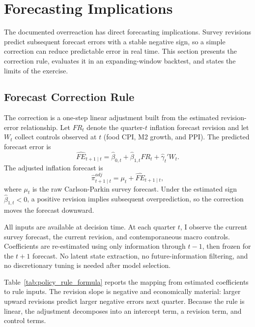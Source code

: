 \section{Forecasting Implications}\label{sec:policy}

The documented overreaction has direct forecasting implications.
Survey revisions predict subsequent forecast errors with a stable
negative sign, so a simple correction can reduce predictable error in
real time. This section presents the correction rule, evaluates it in
an expanding-window backtest, and states the limits of the exercise.

\subsection{Forecast Correction Rule}

The correction is a one-step linear adjustment built from the estimated
revision-error relationship. Let $FR_t$ denote the quarter-$t$
inflation forecast revision and let $W_t$ collect controls observed at
$t$ (food CPI, M2 growth, and PPI). The predicted forecast error is
\begin{equation}\label{eq:policy_rule_policy}
  \widehat{FE}_{t+1 \mid t}
  = \hat{\beta}_{0,t} + \hat{\beta}_{1,t} FR_t + \hat{\gamma}_t' W_t .
\end{equation}
The adjusted inflation forecast is
\begin{equation}\label{eq:adjusted_forecast_policy}
  \widehat{\pi}^{adj}_{t+1 \mid t}
  = \mu_t + \widehat{FE}_{t+1 \mid t},
\end{equation}
where $\mu_t$ is the raw Carlson-Parkin survey forecast. Under the
estimated sign $\hat{\beta}_{1,t} < 0$, a positive revision implies
subsequent overprediction, so the correction moves the forecast
downward.

All inputs are available at decision time. At each quarter $t$, I
observe the current survey forecast, the current revision, and
contemporaneous macro controls. Coefficients are re-estimated using
only information through $t-1$, then frozen for the $t+1$ forecast.
No latent state extraction, no future-information filtering, and no
discretionary tuning is needed after model selection.

Table~\ref{tab:policy_rule_formula} reports the mapping from estimated
coefficients to rule inputs. The revision slope is negative and
economically material: larger upward revisions predict larger negative
errors next quarter. Because the rule is linear, the adjustment
decomposes into an intercept term, a revision term, and control terms.

